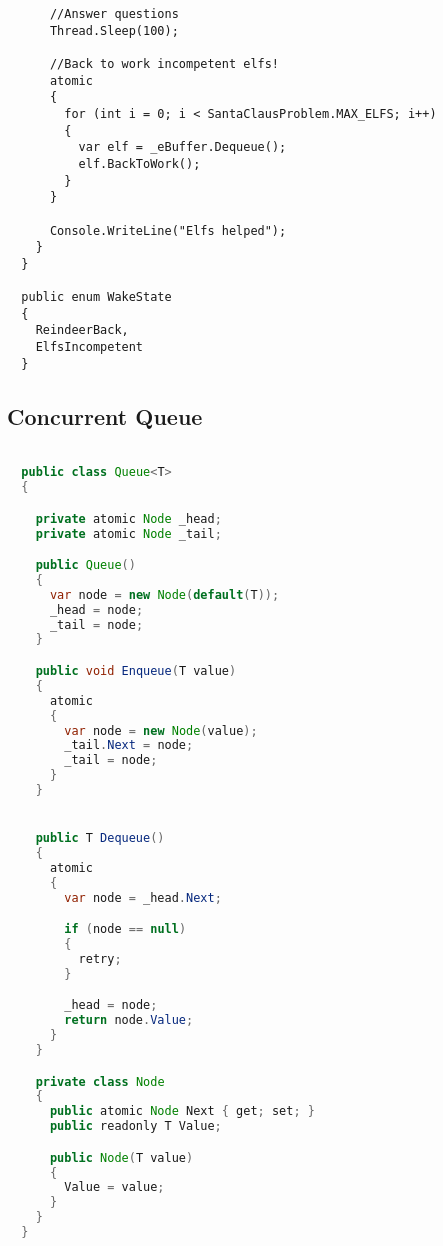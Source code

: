 \begin{lstlisting}
      //Answer questions
      Thread.Sleep(100);

      //Back to work incompetent elfs!
      atomic
      {
        for (int i = 0; i < SantaClausProblem.MAX_ELFS; i++)
        {
          var elf = _eBuffer.Dequeue();
          elf.BackToWork();
        }
      }

      Console.WriteLine("Elfs helped");
    }
  }

  public enum WakeState
  {
    ReindeerBack,
    ElfsIncompetent
  }

\end{lstlisting}
\subsection{Concurrent Queue}
\begin{lstlisting}[label=lst:impl_dining_lib,
  caption={Lock Based Concurrent Hashmap Implementation},
  language=Java,  
  showspaces=false,
  showtabs=false,
  breaklines=true,
  showstringspaces=false,
  breakatwhitespace=true,
  commentstyle=\color{greencomments},
  keywordstyle=\color{bluekeywords},
  stringstyle=\color{redstrings},
  escapechar=~,
  morekeywords={atomic, retry, orelse, var, get, set, ref, out, readonly, virtual, override, region, endregion, foreach, lock}]  % Start your code-block

  public class Queue<T>
  {

    private atomic Node _head;
    private atomic Node _tail;

    public Queue()
    {
      var node = new Node(default(T));
      _head = node;
      _tail = node;
    }

    public void Enqueue(T value)
    {
      atomic
      {
        var node = new Node(value);
        _tail.Next = node;
        _tail = node;
      }
    }


    public T Dequeue()
    {
      atomic
      {
        var node = _head.Next;

        if (node == null)
        {
          retry;
        }

        _head = node;
        return node.Value;
      }
    }

    private class Node
    {
      public atomic Node Next { get; set; }
      public readonly T Value;

      public Node(T value)
      {
        Value = value;
      }
    }
  }

\end{lstlisting}
